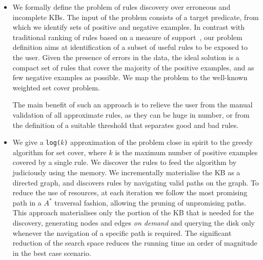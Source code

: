 \begin{itemize}
\item We formally define the problem of rules discovery over erroneous and incomplete KBs. The input of the problem consists of a target predicate, from which we identify sets of positive and negative examples.  In contrast with traditional ranking of rules based on a measure of support~\cite{dehaspe1999discovery,galarraga2015fast,muggleton1995inverse,schoenmackers2010learning}, our  problem definition aims at identification of a subset of useful rules to be exposed to the user. 
Given the presence of errors in the data, the ideal solution is a compact set of rules that cover the majority of the positive examples, and as few negative examples as possible. We map the problem to the well-known weighted set cover problem.

The main benefit of such an approach is to relieve the user from the manual validation of all approximate rules, as they  can be huge in number, or from the definition of a suitable threshold that separates good and bad rules. 


\item We give a \texttt{log($k$)} approximation of the problem close in spirit to the greedy algorithm for set cover, where $k$ is the maximum number of positive examples covered by a single rule. We discover the rules to feed the algorithm by judiciously using the memory. We incrementally 
%
materialise the KB as a directed graph, and discovers rules by navigating valid paths on the graph. To reduce the use of resources, at each iteration we follow the most promising path in a $A^*$ traversal fashion, allowing the pruning of unpromising paths.	
This approach materialises only the portion of the KB that is needed for the discovery, generating nodes and edges \emph{on demand} and querying the disk only whenever the navigation of a specific path is required. 
The significant reduction of the search space reduces the running time an order of magnitude in the best case scenario. 


\end{itemize}
